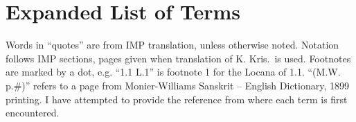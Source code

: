 \documentclass[10pt]{article}
\begin{document}









\section{Expanded List of Terms}

Words in ``quotes'' are from IMP translation, unless otherwise noted.
Notation follows IMP sections, pages given when translation of K. Kris.\ is used.
Footnotes are marked by a dot, e.g. ``1.1 L.1'' is footnote 1 for the Locana of 1.1.
``(M.W. p.\#)'' refers to a page from Monier-Williams Sanskrit -- English Dictionary, 1899 printing.
I have attempted to provide the reference from where each term is first encountered.




\newcommand\litem[1]{\item{\bfseries #1\label{#1}}}
\end{document}

